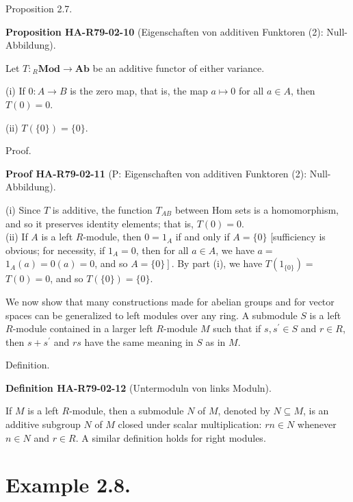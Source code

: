 \documentclass[10pt, letterpaper]{article}
\newcommand{\CustomHeading}[3]{%
  \par\medskip\noindent%
  \textbf{#1 #2} \textnormal{(#3)}.\enskip%
}
\newenvironment{DEF}[2]{\begin{unitbox}\CustomHeading{Definition}{#1}{#2}}{\end{unitbox}}
\newenvironment{PROP}[2]{\begin{unitbox}\CustomHeading{Proposition}{#1}{#2}}{\end{unitbox}}
\newenvironment{PROOF}[2]{\begin{unitbox}\CustomHeading{Proof}{#1}{#2}}{\end{unitbox}}
\begin{document}
Proposition 2.7. 

\begin{PROP}{HA-R79-02-10}{Eigenschaften von additiven Funktoren (2): Null-Abbildung}
Let $T:{ }_{R} \mathbf{M o d} \rightarrow \mathbf{A b}$ be an additive functor of either variance.

(i) If $0: A \rightarrow B$ is the zero map, that is, the map $a \mapsto 0$ for all $a \in A$, then $T(0)=0$.

(ii) $T(\{0\})=\{0\}$.
\end{PROP}

Proof.

\begin{PROOF}{HA-R79-02-11}{P: Eigenschaften von additiven Funktoren (2): Null-Abbildung}
(i) Since $T$ is additive, the function $T_{A B}$ between Hom sets is a homomorphism, and so it preserves identity elements; that is, $T(0)=0$.\\

(ii) If $A$ is a left $R$-module, then $0=1_{A}$ if and only if $A=\{0\}$ [sufficiency is obvious; for necessity, if $1_{A}=0$, then for all $a \in A$, we have $a=$ $1_{A}(a)=0(a)=0$, and so $\left.A=\{0\}\right]$. By part (i), we have $T\left(1_{\{0\}}\right)=$ $T(0)=0$, and so $T(\{0\})=\{0\}$.
\end{PROOF}



We now show that many constructions made for abelian groups and for vector spaces can be generalized to left modules over any ring. A submodule $S$ is a left $R$-module contained in a larger left $R$-module $M$ such that if $s, s^{\prime} \in S$ and $r \in R$, then $s+s^{\prime}$ and $r s$ have the same meaning in $S$ as in $M$.



Definition. 

\begin{DEF}{HA-R79-02-12}{Untermoduln von links Moduln}
If $M$ is a left $R$-module, then a submodule $N$ of $M$, denoted by $N \subseteq M$, is an additive subgroup $N$ of $M$ closed under scalar multiplication: $r n \in N$ whenever $n \in N$ and $r \in R$. A similar definition holds for right modules.
\end{DEF}



\section*{Example 2.8.}
\end{document}
